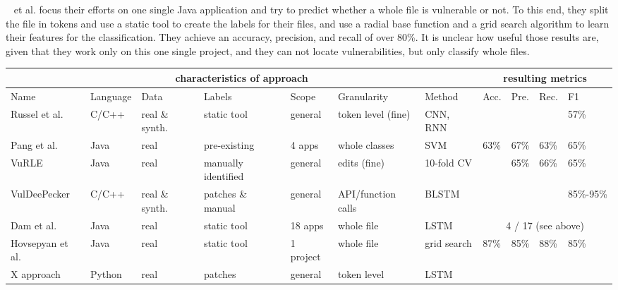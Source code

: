 \documentclass[
a4paper,
pagesize,
pdftex,
12pt,
twoside, %
BCOR=5mm, %
ngerman,
fleqn,
final,
]{scrartcl}
\begin{document}
	~\cite{Hovsepyan.2012} et al. focus their efforts on one single Java application and try to predict whether a whole file is vulnerable or not. To this end, they split the file in tokens and use a static tool to create the labels for their files, and use a radial base function and a grid search algorithm to learn their features for the classification. They achieve an accuracy, precision, and recall of over 80\%. It is unclear how useful those results are, given that they work only on this one single project, and they can not locate vulnerabilities, but only classify whole files. 
	
	\scriptsize
	\begin{tabular}{ | p{1.4cm} | p{1cm}|  p{0.8cm}| p{1.5cm} |  p{1.2cm} | p{1.5cm} | p{1.2cm} || p{0.4cm}|p{0.4cm}|p{0.4cm}|p{0.4cm}|  }
		\hline
		\multicolumn{7}{|c||}{characteristics of approach} & \multicolumn{4}{c|}{resulting metrics} \\
		\hline
		Name &  Language & Data & Labels & Scope &Granularity & Method & Acc. & Pre. & Rec. & F1  \\
		\hline
		Russel et al. & C/C++ & real \& synth. & static tool & general & token level (fine) & CNN, RNN &  &   &   &  57\%  \\
		\hline
		Pang et al. & Java & real  & pre-existing  & 4 apps & whole classes & SVM & 63\% & 67\%  & 63\%  & 65\%    \\
		\hline
		VuRLE & Java & real  & manually identified  & general & edits (fine) & 10-fold CV &  & 65\%  & 66\%  & 65\%    \\
		\hline
		VulDeePecker & C/C++ & real \& synth.  & patches \& manual & general & API/function calls & BLSTM &  &   &  & 85\%-95\%    \\
		\hline
		Dam et al. & Java & real &static tool & 18 apps & whole file & LSTM & \multicolumn{4}{c|}{ 4 / 17 (see above)}   \\
		\hline
		Hovsepyan et al. & Java & real  &static tool  & 1 project & whole file & grid search & 87\% & 	85\%  & 88\%  & 85\%   \\
		\hline
		X approach & Python & real  &patches& general  & token level & LSTM &  & &  &    \\
		\hline
		\hline 
	\end{tabular}\\
	\normalsize
	
\end{document}
